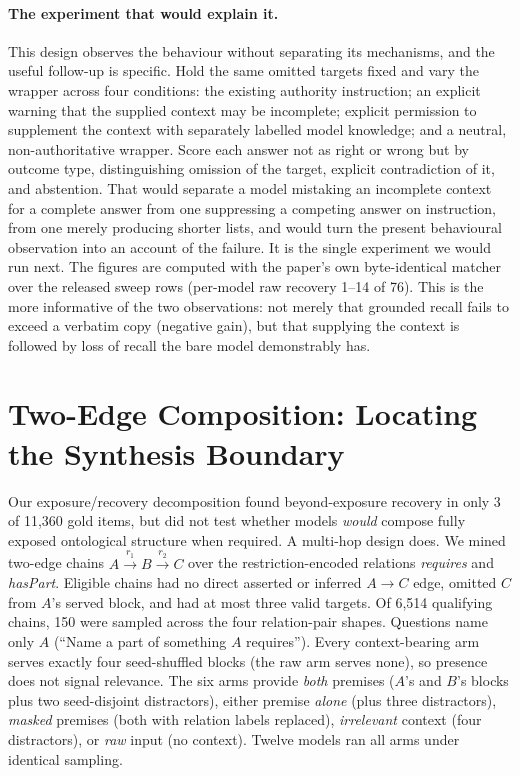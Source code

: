 \documentclass[10pt,twocolumn]{article}
\begin{document}
\paragraph{The experiment that would explain it.} This design observes the behaviour without separating its mechanisms, and the useful follow-up is specific. Hold the same omitted targets fixed and vary the wrapper across four conditions: the existing authority instruction; an explicit warning that the supplied context may be incomplete; explicit permission to supplement the context with separately labelled model knowledge; and a neutral, non-authoritative wrapper. Score each answer not as right or wrong but by outcome type, distinguishing omission of the target, explicit contradiction of it, and abstention. That would separate a model mistaking an incomplete context for a complete answer from one suppressing a competing answer on instruction, from one merely producing shorter lists, and would turn the present behavioural observation into an account of the failure. It is the single experiment we would run next. The figures are computed with the paper's own byte-identical matcher over the released sweep rows (per-model raw recovery 1--14 of 76). This is the more informative of the two observations: not merely that grounded recall fails to exceed a verbatim copy (negative gain), but that supplying the context is followed by loss of recall the bare model demonstrably has.

\section{Two-Edge Composition: Locating the Synthesis Boundary}\label{sec:composition}
Our exposure/recovery decomposition found beyond-exposure recovery in only 3 of 11{,}360
gold items, but did not test whether models \emph{would} compose fully exposed ontological
structure when required. A multi-hop design does. We mined
two-edge chains $A\!\xrightarrow{r_1}\!B\!\xrightarrow{r_2}\!C$ over the restriction-encoded
relations \emph{requires} and \emph{hasPart}. Eligible chains had no direct asserted or inferred
$A\!\to\!C$ edge, omitted $C$ from $A$'s served block, and had at most three valid targets.
Of 6{,}514 qualifying chains, 150 were sampled across the four relation-pair shapes. Questions
name only $A$ (``Name a part of something $A$ requires''). Every context-bearing arm serves
exactly four seed-shuffled blocks (the raw arm serves none), so presence does not signal relevance. The six arms provide \emph{both}
premises ($A$'s and $B$'s blocks plus two seed-disjoint distractors), either premise
\emph{alone} (plus three distractors), \emph{masked} premises (both with relation labels
replaced), \emph{irrelevant} context (four distractors), or \emph{raw} input (no context).
Twelve models ran all arms under identical sampling.
\end{document}
